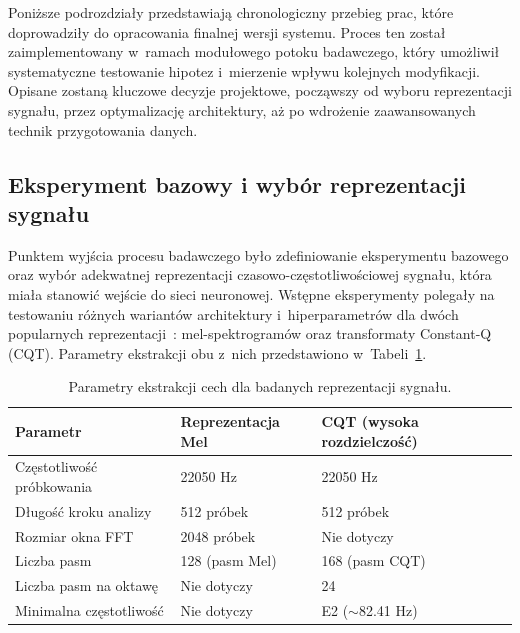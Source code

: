 Poniższe podrozdziały przedstawiają chronologiczny przebieg prac, które doprowadziły do opracowania finalnej wersji systemu. Proces ten został zaimplementowany w~ramach modułowego potoku badawczego, który umożliwił systematyczne testowanie hipotez i~mierzenie wpływu kolejnych modyfikacji. Opisane zostaną kluczowe decyzje projektowe, począwszy od wyboru reprezentacji sygnału, przez optymalizację architektury, aż po wdrożenie zaawansowanych technik przygotowania danych.

\subsection{Eksperyment bazowy i wybór reprezentacji sygnału}
\label{ssec:faza_wstepna_reprezentacja}

Punktem wyjścia procesu badawczego było zdefiniowanie eksperymentu bazowego oraz wybór adekwatnej reprezentacji czasowo-częstotliwościowej sygnału, która miała stanowić wejście do sieci neuronowej. Wstępne eksperymenty polegały na testowaniu różnych wariantów architektury i~hiperparametrów dla dwóch popularnych reprezentacji~\autocite{Benetos2019AutomaticMusicTranscription}: mel-spektrogramów oraz transformaty Constant-Q (CQT). Parametry ekstrakcji obu z~nich przedstawiono w~Tabeli~\ref{tab:parametry_cech}.

\begin{table}[H]
    \centering
    \caption{Parametry ekstrakcji cech dla badanych reprezentacji sygnału.}
    \label{tab:parametry_cech}
    \begin{tabularx}{\textwidth}{|l|X|X|}
        \hline
        \textbf{Parametr} & \textbf{Reprezentacja Mel} & \textbf{CQT (wysoka rozdzielczość)} \\ \hline
        Częstotliwość próbkowania & 22050 Hz & 22050 Hz \\ \hline
        Długość kroku analizy & 512 próbek & 512 próbek \\ \hline
        Rozmiar okna FFT & 2048 próbek & Nie dotyczy \\ \hline
        Liczba pasm & 128 (pasm Mel) & 168 (pasm CQT) \\ \hline
        Liczba pasm na oktawę & Nie dotyczy & 24 \\ \hline
        Minimalna częstotliwość & Nie dotyczy & E2 ($\sim$82.41 Hz) \\ \hline
    \end{tabularx}
\end{table}

